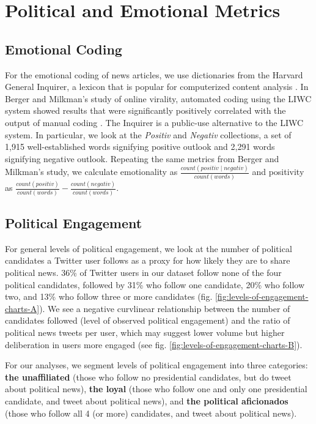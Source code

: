 \documentclass[letterpaper]{article}
\begin{document}
\section{Political and Emotional Metrics}
\subsection{Emotional Coding}
For the emotional coding of news articles, we use dictionaries from the Harvard General Inquirer, a lexicon that is popular for computerized content analysis \cite{stone1963computer}. In Berger and Milkman's study of online virality, automated coding using the LIWC system showed results that were significantly positively correlated with the output of manual coding \cite{berger2012makes}. The Inquirer is a public-use alternative to the LIWC system. In particular, we look at the \emph{Positiv} and \emph{Negativ} collections, a set of 1,915 well-established words signifying positive outlook and 2,291 words signifying negative outlook. Repeating the same metrics from Berger and Milkman's study, we calculate emotionality as $\frac{count(positiv \mid negativ)}{count(words)}$ and positivity as $\frac{count(positiv)}{count(words)} - \frac{count(negativ)}{count(words)}$.

\subsection{Political Engagement}  
For general levels of political engagement, we look at the number of political candidates a Twitter user follows as a proxy for how likely they are to share political news. 36\% of Twitter users in our dataset follow none of the four political candidates, followed by 31\% who follow one candidate, 20\% who follow two, and 13\% who follow three or more candidates (fig. \ref{fig:levels-of-engagement-charts-A}). We see a negative curvlinear relationship between the number of candidates followed (level of observed political engagement) and the ratio of political news tweets per user, which may suggest lower volume but higher deliberation in users more engaged (see fig. \ref{fig:levels-of-engagement-charts-B}).

For our analyses, we segment levels of political engagement into three categories: \textbf{the unaffiliated} (those who follow no presidential candidates, but do tweet about political news), \textbf{the loyal} (those who follow one and only one presidential candidate, and tweet about political news), and \textbf{the political aficionados} (those who follow all 4 (or more) candidates, and tweet about political news).  
\end{document}
